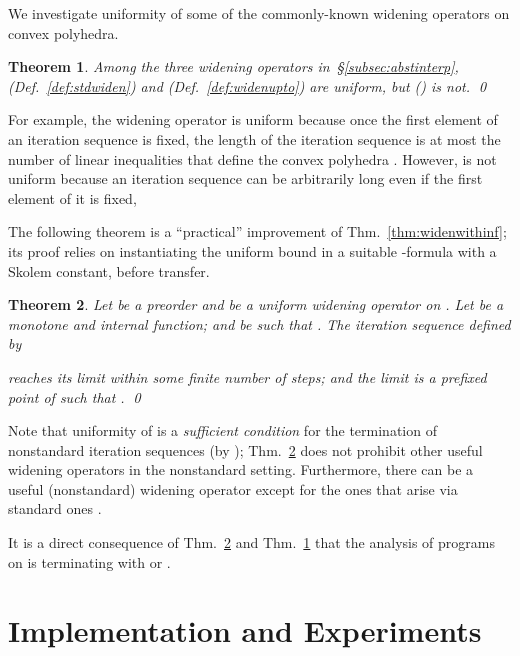 \documentclass[envcountsect,orivec]{llncs} \pdfoutput=1
\newtheorem{mythm}{Theorem}[section]
\theoremstyle{definition}
\def\myqed{\qed}
\begin{document}
We investigate uniformity of some of the commonly-known widening operators on convex polyhedra.
\begin{mythm}\label{thm:uniformityOfKnownWidening}
 Among the three widening operators in~\S{}\ref{subsec:abstinterp},  (Def.~\ref{def:stdwiden}) and  (Def.~\ref{def:widenupto}) are uniform, but  (\cite{Bagnara2005}) is not.
\myqed
\end{mythm}
For example, the widening operator  is uniform because once the first element  of an iteration sequence is fixed, the length of the iteration sequence is at most the number of linear inequalities that define the convex polyhedra .
However,  is not uniform because an iteration sequence can be arbitrarily long even if the first element of it is fixed, 



The following theorem is a ``practical'' improvement of
Thm.~\ref{thm:widenwithinf};
its proof relies on instantiating the uniform bound  
 in a suitable -formula with a Skolem
constant, before transfer.


\begin{mythm}
\label{thm:newunifwidenwithinfinitesimal}
 Let  be a preorder and  be a uniform widening operator on .
Let  
be a monotone and internal function;
and  
be such that .
 The  iteration sequence
  defined by 
 
reaches its limit within some finite number of steps; and the limit
  is a prefixed point of  such that
 . \myqed
\end{mythm}


Note that uniformity of  is a \emph{sufficient condition} for
the termination of nonstandard iteration sequences (by
); Thm.~\ref{thm:newunifwidenwithinfinitesimal} does not
prohibit other useful widening operators in the nonstandard setting.
Furthermore, there can be a useful (nonstandard) widening operator
except for the ones  that arise
via standard ones .








 It is a direct consequence of Thm.~\ref{thm:newunifwidenwithinfinitesimal} and Thm.~\ref{thm:uniformityOfKnownWidening} that the analysis of  programs on  is terminating with  or .






\section{Implementation and Experiments}\label{sec:implementation}
\end{document}
